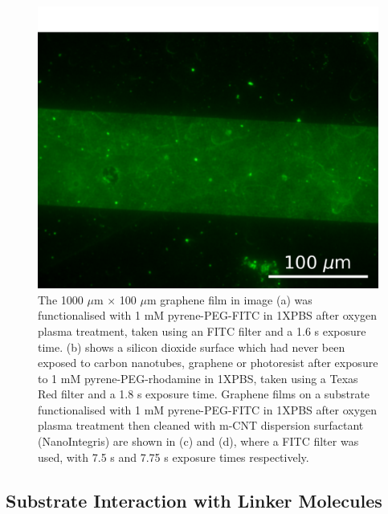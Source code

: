 \documentclass[
  a4paper,
]{scrbook}
\begin{document}
\begin{figure}
\begin{minipage}[t]{0.47\linewidth}
{{\includegraphics{figures/ch7/modified_NGW6D7_PyPEGFITC_channel1_postmsurfclean_7.75sexposure_40X_221123.png}

}

}

\subcaption{\label{fig-PPF-PBS-40X}}
\end{minipage}%

\caption{\label{fig-silicon-dioxide-interaction}The 1000 \(\mu\)m
\(\times\) 100 \(\mu\)m graphene film in image (a) was functionalised
with 1 mM pyrene-PEG-FITC in 1XPBS after oxygen plasma treatment, taken
using an FITC filter and a 1.6 s exposure time. (b) shows a silicon
dioxide surface which had never been exposed to carbon nanotubes,
graphene or photoresist after exposure to 1 mM pyrene-PEG-rhodamine in
1XPBS, taken using a Texas Red filter and a 1.8 s exposure time.
Graphene films on a substrate functionalised with 1 mM pyrene-PEG-FITC
in 1XPBS after oxygen plasma treatment then cleaned with m-CNT
dispersion surfactant (NanoIntegris) are shown in (c) and (d), where a
FITC filter was used, with 7.5 s and 7.75 s exposure times
respectively.}

\end{figure}

\hypertarget{sec-pyrene-interactions}{%
\subsection{Substrate Interaction with Linker
Molecules}\label{sec-pyrene-interactions}}
\end{document}
